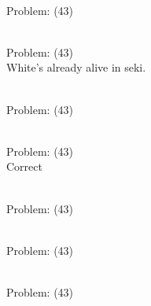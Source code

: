 \documentclass[11pt]{article}
\begin{document}
\begin{minipage}[t]{0.5\textwidth}
  {\centering
  
\\
Problem: (43)\\
  }
\end{minipage}
\begin{minipage}[t]{0.5\textwidth}
  {\centering
  
\\
Problem: (43)\\
White's already alive in seki.\\
  }
\end{minipage}
\begin{minipage}[t]{0.5\textwidth}
  {\centering
  
\\
Problem: (43)\\
  }
\end{minipage}
\begin{minipage}[t]{0.5\textwidth}
  {\centering
  
\\
Problem: (43)\\
Correct\\
  }
\end{minipage}
\begin{minipage}[t]{0.5\textwidth}
  {\centering
  
\\
Problem: (43)\\
  }
\end{minipage}
\begin{minipage}[t]{0.5\textwidth}
  {\centering
  
\\
Problem: (43)\\
  }
\end{minipage}
\begin{minipage}[t]{0.5\textwidth}
  {\centering
  
\\
Problem: (43)\\
  }
\end{minipage}
\end{document}
